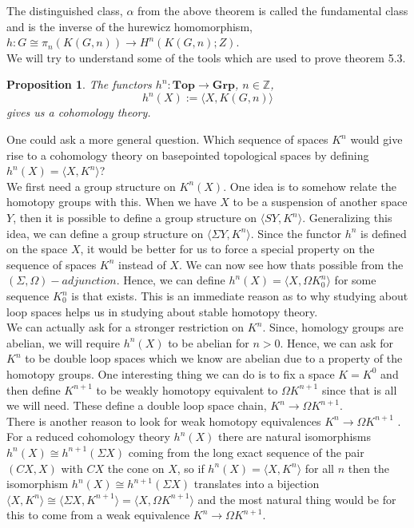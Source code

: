 \documentclass[12pt]{extarticle}
\numberwithin{equation}{section}
\newtheorem{prp}[thm]{Proposition}
\newcommand{\Z}{\mathbb{Z}}
\begin{document}
The distinguished class, $\alpha$ from the above theorem is called the fundamental class and is the inverse of the hurewicz homomorphism, $h:G \cong \pi_n(K(G,n))\to H^n(K(G,n);Z)$.\\

We will try to understand some of the tools which are used to prove theorem 5.3.\\

\begin{prp}
The functors $h^n:\mathbf{Top}\to \mathbf{Grp}$, $n\in \Z$, $$h^n(X):= \langle X,K(G,n)\rangle$$ gives us a cohomology theory.
\end{prp}

One could ask a more general question. Which sequence of spaces $K^n$ would give rise to a cohomology theory on basepointed topological spaces by defining $h^n(X)=\langle X,K^n\rangle$?\\

We first need a group structure on $K^n(X)$. One idea is to somehow relate the homotopy groups with this. When we have $X$ to be a suspension of another space $Y$, then it is possible to define a group structure on $\langle SY, K^n \rangle$. Generalizing this idea, we can define a group structure on $\langle\Sigma Y, K^n\rangle$. Since the functor $h^n$ is defined on the space $X$, it would be better for us to force a special property on the sequence of spaces $K^n$ instead of $X$. We can now see how thats possible from the $(\Sigma,\Omega)-adjunction$. Hence, we can define $h^n(X)=\langle X, \Omega K_0^n \rangle$ for some sequence $K_0^n$ is that exists. This is an immediate reason as to why studying about loop spaces helps us in studying about stable homotopy theory.\\

We can actually ask for a stronger restriction on $K^n$. Since, homology groups are abelian, we will require $h^n(X)$ to be abelian for $n>0$. Hence, we can ask for $K^n$ to be double loop spaces which we know are abelian due to a property of the homotopy groups. One interesting thing we can do is to fix a space $K=K^0$ and then define $K^{n+1}$ to be weakly homotopy equivalent to $\Omega K^{n+1}$ since that is all we will need. These define a double loop space chain, $K^n\to \Omega K^{n+1}$.\\

There is another reason to look for weak homotopy equivalences $K^n\to\Omega K^{n+1}$ .
For a reduced cohomology theory $h^n(X)$ there are natural isomorphisms $h^n(X) \cong
h^{n+1}(\Sigma X)$ coming from the long exact sequence of the pair $(CX,X)$ with $CX$ the
cone on $X$, so if $h^n(X) = \langle X,K^n\rangle$ for all $n$ then the isomorphism $h^n(X) \cong h^{n+1}(\Sigma X)$ translates into a bijection $\langle X,K^n\rangle \cong \langle \Sigma X,K^{n+1}\rangle = \langle X,\Omega K^{n+1}\rangle$ and the most natural
thing would be for this to come from a weak equivalence $K^n\to \Omega K^{n+1}$.
\end{document}
